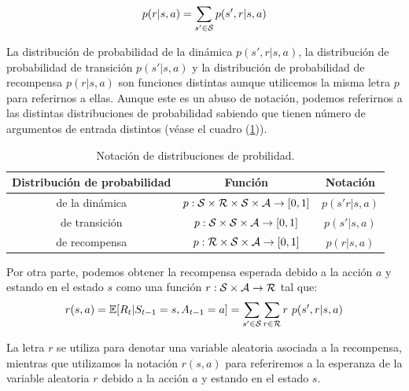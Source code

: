 \begin{gather}
    p(r|s,a) = \sum_{s' \in \mathcal{S}} p(s',r|s,a)
\end{gather}

\begin{obs}
    La distribución de probabilidad de la dinámica $p(s',r|s,a)$, la distribución de probabilidad de transición $p(s'|s,a)$ y la distribución de probabilidad de recompensa $p(r|s,a)$ son funciones distintas aunque utilicemos la misma letra $p$  para referirnos a ellas. Aunque este es un abuso de notación, podemos referirnos a las distintas distribuciones de probabilidad sabiendo que tienen número de argumentos de entrada distintos (véase el cuadro (\ref{DisNot})). 

    \begin{table}[h!]
        \centering
        \begin{tabular}{|c|c|c|}
        \hline
        \textbf{Distribución de probabilidad} &
        \textbf{Función}                      & 
        \textbf{Notación}     \\  \hline
        de la dinámica  &
        $p: \mathcal{S} \times \mathcal{R} \times \mathcal{S} \times \mathcal{A} \rightarrow [0,1]$ &
        $p(s'r|s,a)$ \\ \hline
        de transición   &
        $p: \mathcal{S} \times \mathcal{S} \times \mathcal{A} \rightarrow [0,1]$ &
        $p(s'|s,a)$ \\ \hline
        de recompensa   &
        $p: \mathcal{R} \times \mathcal{S} \times \mathcal{A} \rightarrow [0,1]$ &
        $p(r|s,a)$ \\ \hline        
        \end{tabular}
        \caption{Notación de distribuciones de probilidad.}
        \label{DisNot}
        \end{table}
\end{obs}
 
Por otra parte, podemos obtener la recompensa esperada debido a la acción $a$ y estando en el estado $s$ como una función $r: \mathcal{S} \times \mathcal{A} \rightarrow \mathcal{R} $ tal que:
\begin{gather}\label{r(s,a)}
    r(s,a) = \mathbb{E}[R_t|S_{t-1}=s,A_{t-1}=a] = 
    \sum_{s'\in\mathcal{S}} \sum_{r\in \mathcal{R}} r \ p(s',r|s,a)
\end{gather}

\begin{obs}
     La letra $r$ se utiliza para denotar  una variable aleatoria asociada a la recompensa, mientras que utilizamos la notación $r(s,a)$ para referiremos a la esperanza de la variable aleatoria $r$ debido a la acción $a$ y estando en el estado $s$. 
\end{obs}


